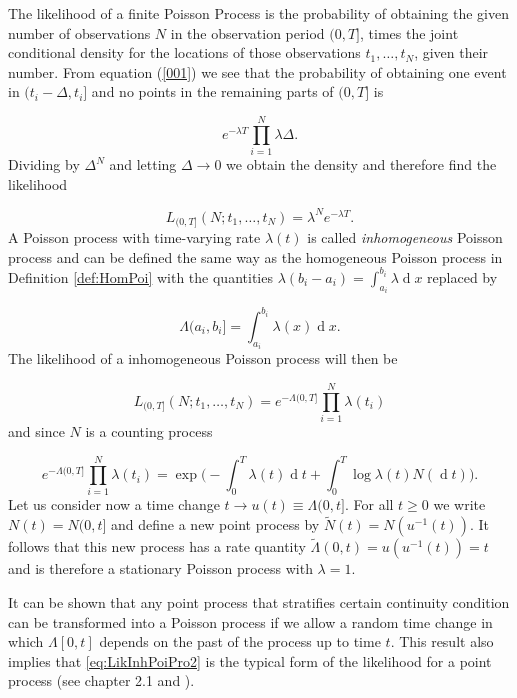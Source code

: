 \documentclass[11pt,a4paper]{article}
\renewcommand{\d}[1]{\ensuremath{\operatorname{d}\!{#1}}}
\begin{document}
The likelihood of a finite Poisson Process is the probability of obtaining the given number of observations $N$ in the observation period $(0,T]$, times the joint conditional density for the locations of those observations $t_1, \dots, t_N$, given their number. From equation (\ref{001}) we see that the probability of obtaining one event in $(t_i - \Delta, t_i]$ and no points in the remaining parts of $(0, T]$ is

\begin{equation*}
    e^{-\lambda T} \prod_{i=1}^N \lambda \Delta.
\end{equation*}
Dividing by $\Delta^N$ and letting $\Delta \rightarrow 0$ we obtain the density and therefore find the likelihood

\begin{equation*}
    L_{(0, T]}(N;t_1, \dots, t_N) = \lambda^N e^{-\lambda T}.
\end{equation*}
A Poisson process with time-varying rate $\lambda(t)$ is called \textit{inhomogeneous} Poisson process and can be defined the same way as the homogeneous Poisson process in Definition \ref{def:HomPoi} with the quantities $\lambda(b_i - a_i) = \int_{a_i}^{b_i} \lambda \d x$ replaced by

\begin{equation*}
    \Lambda(a_i, b_i] = \int_{a_i}^{b_i} \lambda(x) \d x.
\end{equation*}
The likelihood of a inhomogeneous Poisson process will then be

\begin{equation} \label{eq:LikInhPoiPro}
    L_{(0, T]}(N;t_1, \dots, t_N) = e^{-\Lambda(0, T]}\prod_{i=1}^N \lambda(t_i)
\end{equation}
and since $N$ is a counting process

\begin{equation} \label{eq:LikInhPoiPro2}
    e^{-\Lambda(0, T]}\prod_{i=1}^N \lambda(t_i) = \exp \Bigg( - \int_0^T \lambda(t)\d t + \int_0^T \log \lambda(t) N (\d t) \Bigg).
\end{equation}
Let us consider now  a time change $t \rightarrow u(t) \equiv \Lambda(0, t]$. For all $t \geq 0$ we write $N(t) = N (0, t]$ and define a new point process by $\tilde{N}(t) = N(u^{-1}(t))$. It follows that this new process has a rate quantity $\tilde{\Lambda}(0, t) = u(u^{-1}(t)) = t$ and is therefore a stationary Poisson process with $\lambda = 1$.

It can be shown that any point process that stratifies certain continuity condition can be transformed into a Poisson  process if we allow a random time change in which $\Lambda[0, t]$ depends on the past of the process up to time $t$. This result also implies that \ref{eq:LikInhPoiPro2} is the typical form of the likelihood for a point process (see \cite{Daley} chapter 2.1 and \cite{Papangelou}). 
\end{document}
